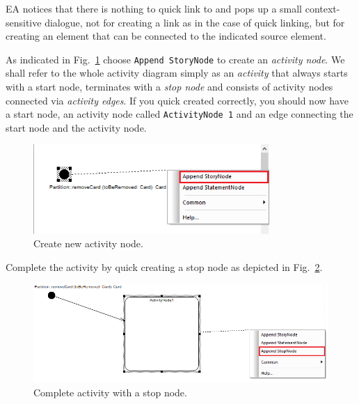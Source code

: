 EA notices that there is nothing to quick link to and pops up a small context-sensitive dialogue, not for creating a link as in the case of quick linking, but for creating an element that can be connected to the indicated source element. 

As indicated in Fig.~\ref{fig:sdm_new_activity_node} choose \texttt{Append StoryNode} to create an \emph{activity node}.  
We
shall refer to the whole activity diagram simply as an \emph{activity} that always starts with a start node, terminates with a \emph{stop node} and consists of activity nodes connected via \emph{activity edges}.  
If you quick created correctly, you should now have a start node, an activity node called \texttt{ActivityNode 1} and an edge connecting the start node and the activity node.

\begin{figure}[htp]
\begin{center}
  \includegraphics[width=0.8\textwidth]{pics/sdmBilder/removeCard/sdm04RAW}
  \caption{Create new activity node.}  
  \label{fig:sdm_new_activity_node}
\end{center}
\end{figure}

Complete the activity by quick creating a stop node as depicted in Fig.~\ref{fig:sdm_stop_node}.

\begin{figure}[htp]
\begin{center}
  \includegraphics[width=\textwidth]{pics/sdmBilder/removeCard/sdm05RAW}
  \caption{Complete activity with a stop node.}  
  \label{fig:sdm_stop_node}
\end{center}
\end{figure}

